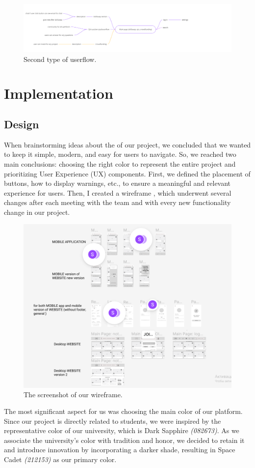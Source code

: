 \begin{figure}[ht]\label{fig:userflow2}
  \centering
  \includegraphics[width=0.8\linewidth]{figures/Userflow -2.png}
  \caption{Second type of userflow.}
\end{figure}

\newpage
\section{Implementation}\label{impl}
\subsection{Design}\label{des}
\hspace*{0.5cm} When brainstorming ideas about the  of our project, we concluded that we wanted to keep it simple, modern, and easy for users to navigate. So, we reached two main conclusions: choosing the right color to represent the entire project and prioritizing User Experience (UX) \cite{design} components. First, we defined the placement of buttons, how to display warnings, etc., to ensure a meaningful and relevant experience for users. Then, I created a wireframe \cite{wireframe}, which underwent several changes after each meeting with the team and with every new functionality change in our project.

\begin{figure}[ht]\label{fig:wireframe}
  \centering
  \includegraphics[width=0.8\linewidth]{figures/wireframe.png}
  \caption{The screenshot of our wireframe.}
\end{figure}
The most significant aspect for us was choosing the main color of our platform. Since our project is directly related to students, we were inspired by the representative color of our university, which is Dark Sapphire \textit{(082673)}. As we associate the university's color with tradition and honor, we decided to retain it and introduce innovation by incorporating a darker shade, resulting in Space Cadet \textit{(212153)} as our primary color. 

